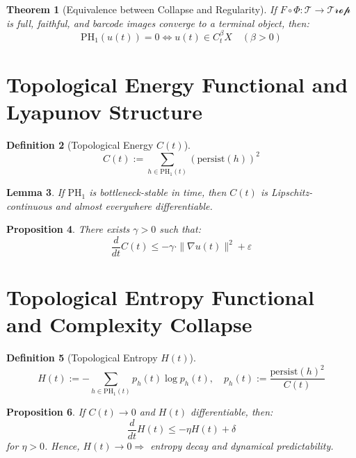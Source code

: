 \documentclass[11pt]{article}
\newtheorem{theorem}{Theorem}[section]
\newtheorem{lemma}[theorem]{Lemma}
\newtheorem{definition}[theorem]{Definition}
\newtheorem{proposition}[theorem]{Proposition}
\begin{document}
\begin{theorem}[Equivalence between Collapse and Regularity]
If \( F \circ \Phi: \mathcal{T} \to \mathcal{Trop} \) is full, faithful, and barcode images converge to a terminal object, then:
\[ \mathrm{PH}_1(u(t)) = 0 \Leftrightarrow u(t) \in C^{\beta}_t X \quad (\beta > 0) \]
\end{theorem}

\begin{center}
\end{center}

\section{Topological Energy Functional and Lyapunov Structure}

\begin{definition}[Topological Energy \( C(t) \)]
\[ C(t) := \sum_{h \in \mathrm{PH}_1(t)} (\text{persist}(h))^2 \]
\end{definition}

\begin{lemma}
If \( \mathrm{PH}_1 \) is bottleneck-stable in time, then \( C(t) \) is Lipschitz-continuous and almost everywhere differentiable.
\end{lemma}

\begin{proposition}
There exists \( \gamma > 0 \) such that:
\[ \frac{d}{dt} C(t) \leq -\gamma \cdot \| \nabla u(t) \|^2 + \varepsilon \]
\end{proposition}

\section{Topological Entropy Functional and Complexity Collapse}

\begin{definition}[Topological Entropy \( H(t) \)]
\[ H(t) := - \sum_{h \in \mathrm{PH}_1(t)} p_h(t) \log p_h(t), \quad p_h(t) := \frac{\text{persist}(h)^2}{C(t)} \]
\end{definition}

\begin{proposition}
If \( C(t) \to 0 \) and \( H(t) \) differentiable, then:
\[ \frac{d}{dt} H(t) \leq -\eta H(t) + \delta \]
for \( \eta > 0 \). Hence, \( H(t) \to 0 \Rightarrow \) entropy decay and dynamical predictability.
\end{proposition}
\end{document}
